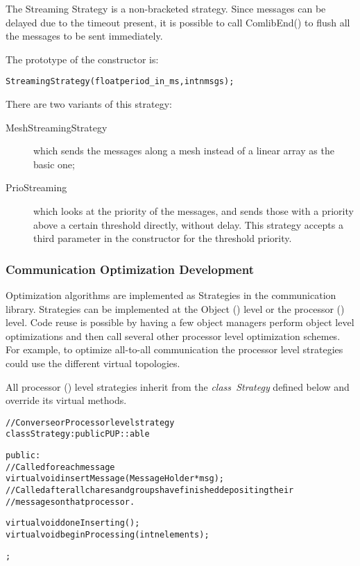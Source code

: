 {The Streaming Strategy is a non-bracketed strategy. Since messages can be
delayed due to the timeout present, it is possible to call
{\textrm{ComlibEnd()}} to flush all the messages to be sent immediately.

The prototype of the constructor is:

\begin{alltt}
StreamingStrategy(float period\_in\_ms, int nmsgs);
\end{alltt}

There are two variants of this strategy:

\begin{description}
\item[MeshStreamingStrategy] which sends the messages along a mesh instead of a linear array as the basic one;
\item[PrioStreaming] which looks at the priority of the messages, and sends those with a priority above a certain threshold directly, without delay. This strategy accepts a third parameter in the constructor for the threshold priority.
\end{description}


\subsubsection{Communication Optimization Development}

Optimization algorithms are implemented as Strategies in the communication
library. Strategies can be implemented at the Object (\charmpp) level or the
processor (\converse) level. Code reuse is possible by having a few object
managers perform object level optimizations and then call several other
processor level optimization schemes. For example, to optimize all-to-all
communication the processor level strategies could use the different virtual
topologies.

All processor (\converse) level strategies inherit from the {\em class~Strategy}
defined below and override its virtual methods.

\begin{alltt}
// Converse or Processor level strategy
class Strategy : public PUP::able{
public:
    // Called for each message
    virtual void insertMessage(MessageHolder *msg);
    // Called after all chares and groups have finished depositing their
    // messages on that processor.

    virtual void doneInserting();
    virtual void beginProcessing(int nelements);
};
\end{alltt}

}
